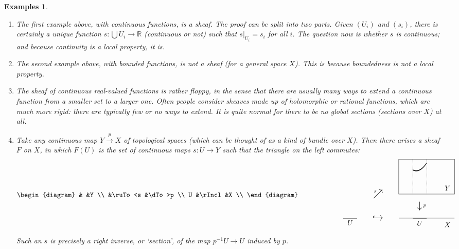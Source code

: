 \documentclass{article}
\newcommand{\reals}{\mathbb{R}}
\newcommand{\cell}[4]{\put(#1,#2){\makebox(0,0)[#3]{\ensuremath{#4}}}}
\newcommand{\toby}[1]{\stackrel{#1}{\to}}
\newcommand{\restr}[1]{\vert_{#1}}
\newcommand{\incl}{\hookrightarrow}
\newcommand{\cln}{\colon}
\newtheorem{preexamples}[thm]{Examples}
\newenvironment{examples}{\begin{preexamples}\upshape}{\end{preexamples}}
\begin{document}
\begin{examples}        \label{eg:sheaves}
\begin{enumerate}
\item The first example above, with continuous functions, is a sheaf.  The
proof can be split into two parts.  Given $(U_i)$ and $(s_i)$, there is
certainly a unique \emph{function} $s\cln \bigcup U_i \to \reals$ (continuous
or not) such that $s\restr{U_i} = s_i$ for all $i$.  The question now is
whether $s$ is continuous; and because continuity is a local property, it is.

\item The second example above, with bounded functions, is not a sheaf (for a
general space $X$).  This is because boundedness is \emph{not} a local
property.  

\item  \label{eg:shf-extend}
The sheaf of continuous real-valued functions is rather floppy, in the
sense that there are usually many ways to extend a continuous function from a
smaller set to a larger one.  Often people consider sheaves made up of
holomorphic or rational functions, which are much more rigid: there are
typically few or no ways to extend.  It is quite normal for there to be no
global sections (sections over $X$) at all.

\item   \label{eg:shf-bundle} 
Take any continuous map $Y \toby{p} X$ of topological spaces (which can be
thought of as a kind of bundle over $X$).  Then there arises a sheaf $F$ on
$X$, in which $F(U)$ is the set of continuous maps $s\cln U \to Y$ such that
the triangle on the left commutes:
\[
\begin{diagram}
        &               &Y      \\
        &\ruTo<s        &\dTo>p \\
U       &\rIncl         &X      \\
\end{diagram}
\qquad\qquad\qquad
\setlength{\unitlength}{1em}
\setlength{\fboxsep}{0pt}
\begin{array}{c}
\begin{picture}(16,10)
\thicklines
\put(0,1.4){\line(1,0){2}}
\cell{1}{.5}{b}{U}
% 
\put(10,1.4){\line(1,0){2}}
\cell{11}{.4}{b}{U}
\thinlines
\put(8,1.5){\line(1,0){8}}
\cell{15}{0.2}{b}{X}
% 
\put(8,5){\framebox(8,5)}
\cell{15}{5.5}{b}{Y}
% 
\qbezier[30](10,5)(10,7.5)(10,10)
\qbezier[30](12,5)(12,7.5)(12,10)
\qbezier(10,8.5)(11,8)(12,9.5)
\qbezier(10,8.45)(11,7.95)(12,9.45)
% 
\cell{5}{1.5}{c}{\mbox{\Large\ensuremath{\incl}}}
\cell{11}{3.25}{c}{\mbox{\Large\ensuremath{\downarrow}}}
\cell{11.5}{3.25}{l}{\scriptstyle{p}}
\cell{5}{5}{c}{\mbox{\Large\ensuremath{\nearrow}}}
\cell{4.8}{5.2}{br}{\scriptstyle{s}}
\end{picture}%
\end{array}
\]
Such an $s$ is precisely a right inverse, or `section', of the map
$p^{-1}U \to U$ induced by $p$.
\end{enumerate}
\end{examples}
\end{document}
